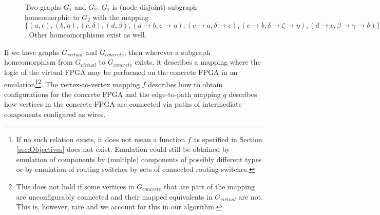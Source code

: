 \begin{figure}
\centering
\parbox{1.2in}{

}
\qquad\qquad
\begin{minipage}{1.2in}%

\end{minipage}
\caption{Two graphs $G_1$ and $G_2$. $G_1$ is (node disjoint) subgraph homeomorphic to $G_2$ with the mapping $\{(a, \epsilon), (b, \eta), (c, \delta), (d, \beta), (a \to b, \epsilon \to \eta), (c \to a, \delta \to \epsilon), (c \to b, \delta \to \zeta \to \eta), (d \to c, \beta \to \gamma \to \delta)\}$. Other homeomorphisms exist as well.}
\end{figure}

If we have graphs $G_{virtual}$ and $G_{concrete}$, then wherever a subgraph homeomorphism from $G_{virtual}$ to $G_{concrete}$ exists, it describes a mapping where the logic of the virtual FPGA may be performed on the concrete FPGA in an emulation\footnote{If no such relation exists, it does not mean a function $f$ as specified in Section \ref{sec:Objectives} does not exist. Emulation could still be obtained by emulation of components by (multiple) components of possibly different types or by emulation of routing switches by sets of connected routing switches.}\footnote{This does not hold if some vertices in $G_{concrete}$ that are part of the mapping are unconfigurably connected and their mapped equivalents in $G_{virtual}$ are not. This is, however, rare and we account for this in our algorithm.}. The vertex-to-vertex mapping $f$ describes how to obtain configurations for the concrete FPGA and the edge-to-path mapping $q$ describes how vertices in the concrete FPGA are connected via paths of intermediate components configured as wires.

